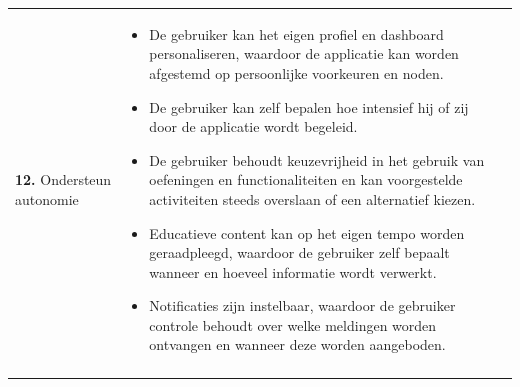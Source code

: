 {\begin{longtable}{
            >{\raggedright\arraybackslash}p{5.23cm}
            >{\raggedright\arraybackslash}p{4.93cm}
            >{\raggedright\arraybackslash}p{4.93cm}
        }
        \addlinespace[5pt]
        
        \textbf{12.} Ondersteun autonomie
        &  
        \begin{itemize}[nosep,leftmargin=*,itemsep=10pt] 
            \renewcommand{\labelitemi}{+} 
            \item De gebruiker kan het eigen profiel en dashboard personaliseren, waardoor de applicatie kan worden afgestemd op persoonlijke voorkeuren en noden.
            \item De gebruiker kan zelf bepalen hoe intensief hij of zij door de applicatie wordt begeleid.
            \item De gebruiker behoudt keuzevrijheid in het gebruik van oefeningen en functionaliteiten en kan voorgestelde activiteiten steeds overslaan of een alternatief kiezen.
            \item Educatieve content kan op het eigen tempo worden geraadpleegd, waardoor de gebruiker zelf bepaalt wanneer en hoeveel informatie wordt verwerkt.
            \item Notificaties zijn instelbaar, waardoor de gebruiker controle behoudt over welke meldingen worden ontvangen en wanneer deze worden aangeboden.
        \end{itemize} 
        &
        \\
        
        \addlinespace[5pt]
        

\end{longtable}}
